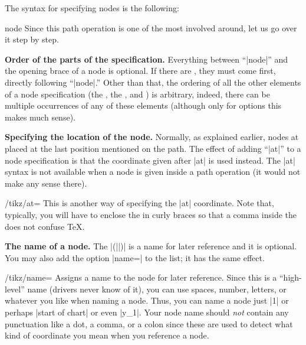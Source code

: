 The syntax for specifying nodes is the following:
\begin{pathoperation}{node}{%
    }
  Since this path operation is one of the most involved around, let us
  go over it step by step.

  \medskip
  \textbf{Order of the parts of the specification.}
  Everything between ``|node|'' and the opening brace of a node is
  optional. If there are , they must come
  first, directly following ``|node|.'' Other than that, the ordering
  of all the other elements of a node specification (the
  , the  , and ) is
  arbitrary, indeed, there can be multiple occurrences of any of these
  elements (although only for options this makes much sense).  

  \medskip
  \textbf{Specifying the location of the node.}
  Normally, as explained earlier, nodes at placed at the last position
  mentioned on the path. The effect of adding ``|at|'' to a node
  specification is that the coordinate given after |at| is used
  instead. The |at| syntax is not available when a node is given
  inside a path operation (it would not make any sense there).

  \begin{key}{/tikz/at=}
    This is another way of specifying the |at| coordinate. Note that,
    typically, you will have to enclose the  in curly
    braces so that a comma inside the  does not
    confuse \TeX.
  \end{key}
  
  \medskip
  \textbf{The name of a node.}
  The |(||)| is a name for later reference and it is
  optional. You may also add the option |name=| to the
   list; it has the same effect.

  \begin{key}{/tikz/name=}
    Assigns a name to the node for later reference. Since this is a
    ``high-level'' name (drivers never know of it), you can use spaces,
    number, letters, or whatever you like when naming a node. Thus, you
    can name a node just |1| or perhaps |start of chart| or even
    |y_1|. Your node name should \emph{not} contain any punctuation like
    a dot, a comma, or a colon since these are used to detect what kind
    of coordinate you mean when you reference a node.
  \end{key}


\end{pathoperation}
